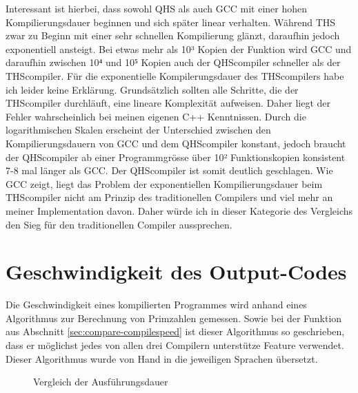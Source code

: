 Interessant ist hierbei, dass sowohl QHS als auch GCC mit einer hohen Kompilierungsdauer beginnen und sich später linear verhalten. Während THS zwar zu Beginn mit einer sehr schnellen Kompilierung glänzt,
daraufhin jedoch exponentiell ansteigt. Bei etwas mehr als 10³ Kopien der Funktion wird GCC und daraufhin zwischen 10⁴ und 10⁵ Kopien auch der QHScompiler schneller als der THScompiler. Für die exponentielle Kompilerungsdauer
des THScompilers habe ich leider keine Erklärung. Grundsätzlich sollten alle Schritte, die der THScompiler durchläuft, eine lineare Komplexität aufweisen. Daher liegt der Fehler wahrscheinlich bei meinen eigenen C++ Kenntnissen.
Durch die logarithmischen Skalen erscheint der Unterschied zwischen den Kompilierungsdauern von GCC und dem QHScompiler konstant, jedoch braucht der QHScompiler ab einer Programmgrösse über 10² Funktionskopien konsistent 7-8 mal
länger als GCC. 
Der QHScompiler ist somit deutlich geschlagen. Wie GCC zeigt, liegt das Problem der exponentiellen Kompilierungsdauer beim THScompiler nicht am Prinzip des traditionellen Compilers und viel mehr an meiner Implementation davon.
Daher würde ich in dieser Kategorie des Vergleichs den Sieg für den traditionellen Compiler aussprechen.


\section{Geschwindigkeit des Output-Codes} \label{sec:execute_speed}
Die Geschwindigkeit eines kompilierten Programmes wird anhand eines Algorithmus zur Berechnung von Primzahlen gemessen. Sowie bei der Funktion aus Abschnitt \ref{sec:compare-compilespeed} ist dieser Algorithmus so geschrieben,
dass er möglichst jedes von allen drei Compilern unterstütze Feature verwendet. Dieser Algorithmus wurde von Hand in die jeweiligen Sprachen übersetzt.

\begin{figure}[h!]
\centering
\label{fig:executespeed}
\caption{Vergleich der Ausführungsdauer}
\end{figure}

